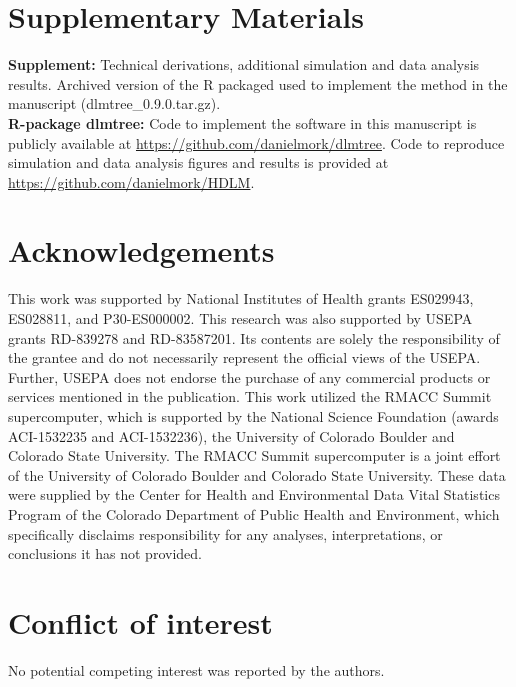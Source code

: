 \documentclass[12pt]{article}
\begin{document}
\section*{Supplementary Materials}
\textbf{Supplement:} Technical derivations, additional simulation and data analysis results. Archived version of the R packaged used to implement the method in the manuscript (dlmtree\_0.9.0.tar.gz). \\
\textbf{R-package dlmtree:} Code to implement the software in this manuscript is publicly available at \url{https://github.com/danielmork/dlmtree}. Code to reproduce simulation and data analysis figures and results is provided at \url{https://github.com/danielmork/HDLM}.


\section*{Acknowledgements}
This work was supported by National Institutes of Health grants ES029943, ES028811, and P30-ES000002. This research was also supported by USEPA grants RD-839278 and RD-83587201. Its contents are solely the responsibility of the grantee and do not necessarily represent the official views of the USEPA. Further, USEPA does not endorse the purchase of any commercial products or services mentioned in the publication. This work utilized the RMACC Summit supercomputer, which is supported by the National Science Foundation (awards ACI-1532235 and ACI-1532236), the University of Colorado Boulder and Colorado State University. The RMACC Summit supercomputer is a joint effort of the University of Colorado Boulder and Colorado State University. These data were supplied by the Center for Health and Environmental Data Vital Statistics Program of the Colorado Department of Public Health and Environment, which specifically disclaims responsibility for any analyses, interpretations, or conclusions it has not provided.

\section*{Conflict of interest}
No potential competing interest was reported by the authors.


\end{document}

